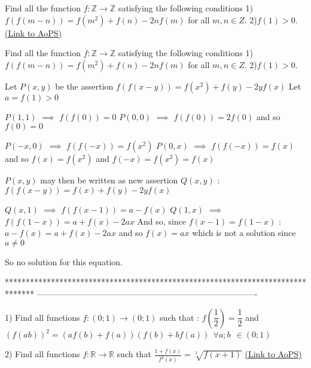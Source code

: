 \begin{problem}
	Find all the function $f: \mathbb{Z}\to\mathbb{Z}$ satisfying the following conditions
1) $f(f(m-n))=f(m^2)+f(n)-2nf(m)$ for all $m,n{\in}Z$. 2)$f(1)>0$.
	\flushright \href{https://artofproblemsolving.com/community/c6h564333}{(Link to AoPS)}
\end{problem}



\begin{solution}
	\begin{tcolorbox}Find all the function $f: \mathbb{Z}\to\mathbb{Z}$ satisfying the following conditions
1) $f(f(m-n))=f(m^2)+f(n)-2nf(m)$ for all $m,n{\in}Z$. 2)$f(1)>0$.\end{tcolorbox}
Let $P(x,y)$ be the assertion $f(f(x-y))=f(x^2)+f(y)-2yf(x)$
Let $a=f(1)>0$

$P(1,1)$ $\implies$ $f(f(0))=0$
$P(0,0)$ $\implies$ $f(f(0))=2f(0)$ and so $f(0)=0$

$P(-x,0)$ $\implies$ $f(f(-x))=f(x^2)$
$P(0,x)$ $\implies$ $f(f(-x))=f(x)$  and so $f(x)=f(x^2)$ and $f(-x)=f(x^2)=f(x)$

$P(x,y)$ may then be written as new assertion $Q(x,y)$ : $f(f(x-y))=f(x)+f(y)-2yf(x)$

$Q(x,1)$ $\implies$ $f(f(x-1))=a-f(x)$
$Q(1,x)$ $\implies$ $f(f(1-x))=a+f(x)-2ax$
And so, since $f(x-1)=f(1-x)$  : $a-f(x)=a+f(x)-2ax$ and so $f(x)=ax$ which is not a solution since $a\ne 0$

So no solution for this equation.
\end{solution}
*******************************************************************************
-------------------------------------------------------------------------------

\begin{problem}
	1) Find all functions $ f : ( 0 ; 1) \to ( 0 ; 1) $ such that : $ f \left( \dfrac{1}{2} \right) = \dfrac{1}{2}$  and $ (f(ab))^2 = ( af(b) + f(a)) ( f(b) + bf(a)) \ \ \forall a ; b \ \ \in ( 0 ; 1) $

2) Find all functions $f:\mathbb{R}\to \mathbb{R}$ such that $\frac{1+f(x)}{f^{2}(x)}=\sqrt[3]{f(x+1)}$
	\flushright \href{https://artofproblemsolving.com/community/c6h564343}{(Link to AoPS)}
\end{problem}



